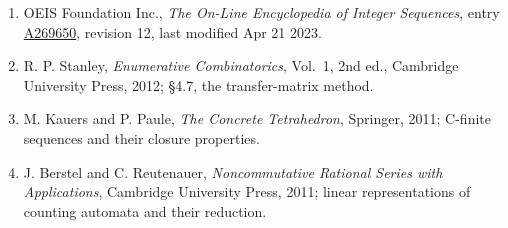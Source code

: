 \documentclass[11pt]{article}
\theoremstyle{definition}
\begin{document}
\begin{enumerate}

\item OEIS Foundation Inc., \emph{The On-Line Encyclopedia of Integer Sequences}, entry \href{https://oeis.org/A269650}{A269650}, revision 12, last modified Apr 21 2023.

\item R. P. Stanley, \emph{Enumerative Combinatorics}, Vol.~1, 2nd ed., Cambridge University Press, 2012; \S4.7, the transfer-matrix method.

\item M. Kauers and P. Paule, \emph{The Concrete Tetrahedron}, Springer, 2011; C-finite sequences and their closure properties.

\item J. Berstel and C. Reutenauer, \emph{Noncommutative Rational Series with Applications}, Cambridge University Press, 2011; linear representations of counting automata and their reduction.

\end{enumerate}
\end{document}
